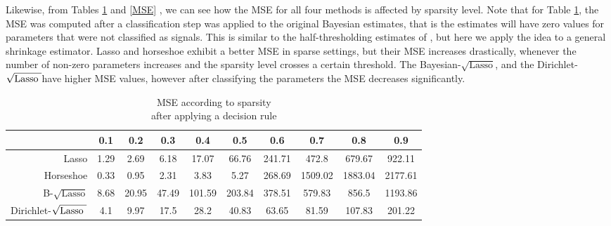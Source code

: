 \documentclass[10pt]{article}
\def\sql{$\sqrt{\text{Lasso}}$}
\def\sqdl{Dirichlet-$\sqrt{\text{\rm{Lasso} }}$}
\begin{document}
Likewise, from Tables \ref{MSE_dec} and \ref{MSE} , we can see how the MSE for all four methods is affected by sparsity level. Note that for Table \ref{MSE_dec}, the MSE was computed after a classification step was applied to the original Bayesian estimates, that is the estimates will have zero values for parameters that were not classified as signals. This is similar to the half-thresholding estimates of \cite{tang2016bayesian}, but here we apply the idea to a general shrinkage estimator. Lasso and horseshoe exhibit a better MSE in sparse settings, but their MSE increases drastically, whenever the number of non-zero parameters increases and the sparsity level crosses a certain threshold. The Bayesian-\sql, and the \sqdl have higher MSE values, however after classifying the parameters the MSE decreases significantly. 



\begin{table}[h!]
\caption{MSE according to sparsity\\ after applying a decision rule}\label{MSE_dec}
\begin{center}
\footnotesize{
\begin{tabular}{c|c|c|c|c|c|c|c|c|c|}
\cline{2-10}
    & 0.1  &  0.2  &  0.3  &  0.4  &  0.5 &   0.6  &  0.7  &  0.8 &   0.9 	\\
\hline
\multicolumn{1}{|r|}{Lasso} & 1.29 &  2.69 &  6.18 &  17.07 & 66.76 &  241.71 & 472.8 &  679.67 &  922.11	\\
\hline
\multicolumn{1}{|r|}{Horseshoe} &   0.33 & 0.95 &  2.31 &  3.83 &   5.27 &   268.69 & 1509.02 & 1883.04 & 2177.61 \\
\hline
\multicolumn{1}{|r|}{B-\sql} & 8.68 & 20.95 & 47.49 & 101.59 & 203.84 & 378.51 & 579.83 &  856.5 &   1193.86 \\
\hline
\multicolumn{1}{|r|}{\sqdl} &4.1 &  9.97 &  17.5 &  28.2 &   40.83 &  63.65 &  81.59 &   107.83 &  201.22 \\
\hline
\end{tabular}}
\end{center}

\end{table}
\end{document}
